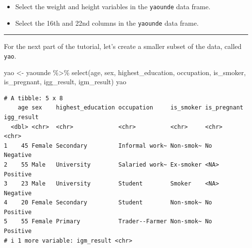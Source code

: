 \documentclass[
  letterpaper,
  DIV=11,
  numbers=noendperiod]{scrreprt}
\newenvironment{Shaded}{\begin{snugshade}}{\end{snugshade}}
\newcommand{\FunctionTok}[1]{\textcolor[rgb]{0.28,0.35,0.67}{#1}}
\newcommand{\NormalTok}[1]{\textcolor[rgb]{0.00,0.23,0.31}{#1}}
\newcommand{\OtherTok}[1]{\textcolor[rgb]{0.00,0.23,0.31}{#1}}
\newcommand{\SpecialCharTok}[1]{\textcolor[rgb]{0.37,0.37,0.37}{#1}}
\providecommand{\tightlist}{%
  \setlength{\itemsep}{0pt}\setlength{\parskip}{0pt}}\usepackage{longtable,booktabs,array}
\begin{document}
\begin{tcolorbox}[enhanced jigsaw, titlerule=0mm, colback=white, left=2mm, breakable, opacitybacktitle=0.6, colbacktitle=quarto-callout-tip-color!10!white, colframe=quarto-callout-tip-color-frame, bottomtitle=1mm, opacityback=0, coltitle=black, arc=.35mm, toptitle=1mm, title=\textcolor{quarto-callout-tip-color}{\faLightbulb}\hspace{0.5em}{Practice}, leftrule=.75mm, toprule=.15mm, bottomrule=.15mm, rightrule=.15mm]

\begin{itemize}
\tightlist
\item
  Select the weight and height variables in the \texttt{yaounde} data
  frame.
\end{itemize}

\begin{itemize}
\tightlist
\item
  Select the 16th and 22nd columns in the \texttt{yaounde} data frame.
\end{itemize}

\end{tcolorbox}

\begin{center}\rule{0.5\linewidth}{0.5pt}\end{center}

For the next part of the tutorial, let's create a smaller subset of the
data, called \texttt{yao}.

\begin{Shaded}
\begin{Highlighting}[]
\NormalTok{yao }\OtherTok{\textless{}{-}}
\NormalTok{  yaounde }\SpecialCharTok{\%\textgreater{}\%} \FunctionTok{select}\NormalTok{(age,}
\NormalTok{                     sex,}
\NormalTok{                     highest\_education,}
\NormalTok{                     occupation,}
\NormalTok{                     is\_smoker,}
\NormalTok{                     is\_pregnant,}
\NormalTok{                     igg\_result,}
\NormalTok{                     igm\_result)}
\NormalTok{yao}
\end{Highlighting}
\end{Shaded}

\begin{verbatim}
# A tibble: 5 x 8
    age sex    highest_education occupation     is_smoker is_pregnant igg_result
  <dbl> <chr>  <chr>             <chr>          <chr>     <chr>       <chr>     
1    45 Female Secondary         Informal work~ Non-smok~ No          Negative  
2    55 Male   University        Salaried work~ Ex-smoker <NA>        Positive  
3    23 Male   University        Student        Smoker    <NA>        Negative  
4    20 Female Secondary         Student        Non-smok~ No          Positive  
5    55 Female Primary           Trader--Farmer Non-smok~ No          Positive  
# i 1 more variable: igm_result <chr>
\end{verbatim}
\end{document}

